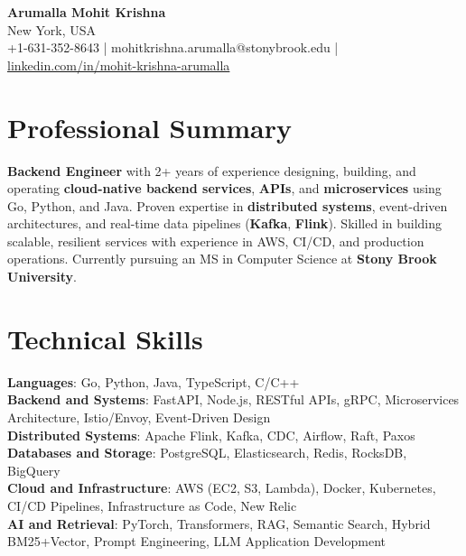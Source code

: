 \documentclass[letterpaper,11pt]{article}
\begin{document}
\begin{center}
  {\Large \textbf{Arumalla Mohit Krishna}} \\
  New York, USA \\
  +1-631-352-8643 \enspace | \enspace mohitkrishna.arumalla@stonybrook.edu \enspace | \enspace \href{https://www.linkedin.com/in/mohit-krishna-arumalla}{linkedin.com/in/mohit-krishna-arumalla}
\end{center}

\section{Professional Summary}
  \begin{itemize}[leftmargin=0.15in, label={}]
    \small{\item{
     \textbf{Backend Engineer} with 2+ years of experience designing, building, and operating \textbf{cloud-native backend services}, \textbf{APIs}, and \textbf{microservices} using Go, Python, and Java. Proven expertise in \textbf{distributed systems}, event-driven architectures, and real-time data pipelines (\textbf{Kafka}, \textbf{Flink}). Skilled in building scalable, resilient services with experience in AWS, CI/CD, and production operations. Currently pursuing an MS in Computer Science at \textbf{Stony Brook University}.
    }}
  \end{itemize}
\vspace{-16pt}

\section{Technical Skills}
 \begin{itemize}[leftmargin=0.15in, label={}]
    \small{\item{
     \textbf{Languages}: Go, Python, Java, TypeScript, C/C++ \\
     \textbf{Backend and Systems}: FastAPI, Node.js, RESTful APIs, gRPC, Microservices Architecture, Istio/Envoy, Event-Driven Design \\
     \textbf{Distributed Systems}: Apache Flink, Kafka, CDC, Airflow, Raft, Paxos \\
     \textbf{Databases and Storage}: PostgreSQL, Elasticsearch, Redis, RocksDB, BigQuery \\
     \textbf{Cloud and Infrastructure}: AWS (EC2, S3, Lambda), Docker, Kubernetes, CI/CD Pipelines, Infrastructure as Code, New Relic \\
     \textbf{AI and Retrieval}: PyTorch, Transformers, RAG, Semantic Search, Hybrid BM25+Vector, Prompt Engineering, LLM Application Development
    }}
 \end{itemize}
\vspace{-16pt}
\end{document}

